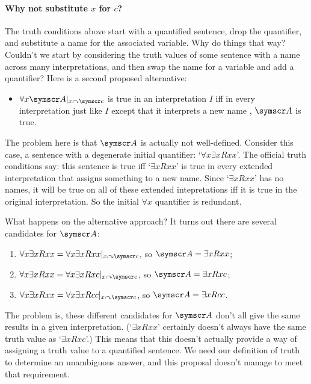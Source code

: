 \paragraph{Why not substitute $x$ for $c$?} The truth conditions above start with a quantified sentence, drop the quantifier, and substitute a name for the associated variable. Why do things that way? Couldn't we start by considering the truth values of some sentence with a name across many interpretations, and then swap the name for a variable and add a quantifier? Here is a second proposed alternative: \begin{itemize}
	\item $\forall x \meta{A}\subs{x}{\meta{c}}$ is true in an interpretation $I$ iff in every interpretation just like $I$ except that it interprets a new name , $\meta{A}$ is true.
\end{itemize} 
The problem here is that $\meta{A}$ is actually not well-defined. Consider this case, a sentence with a degenerate initial quantifier: `$\forall x \exists x Rxx$'. The official truth conditions say: this sentence is true iff `$\exists x Rxx$' is true in every extended interpretation that assigns something to a new name. Since `$\exists x Rxx$' has no names, it will be true on all of these extended intepretations iff it is true in the original interpretation. So the initial $\forall x$ quantifier is redundant.

What happens on the alternative approach? It turns out there are several candidates for $\meta{A}$: \begin{enumerate}
	\item $\forall x \exists x Rxx = \forall x \exists x Rxx\subs{x}{\meta{c}}$, so $\meta{A} = \exists x Rxx$;
	\item $\forall x \exists x Rxx = \forall x \exists x Rxc\subs{x}{\meta{c}}$, so $\meta{A} = \exists x Rxc$;
	\item $\forall x \exists x Rxx = \forall x \exists x Rcc\subs{x}{\meta{c}}$, so $\meta{A} = \exists x Rcc$.
\end{enumerate} The problem is, these different candidates for $\meta{A}$ don't all give the same results in a given interpretation. (`$\exists x Rxx$' certainly doesn't always have the same truth value as `$\exists x Rxc$'.) This means that this doesn't actually provide a way of assigning a truth value to a quantified sentence. We need our definition of truth to determine an unambiguous answer, and this proposal doesn't manage to meet that requirement.


